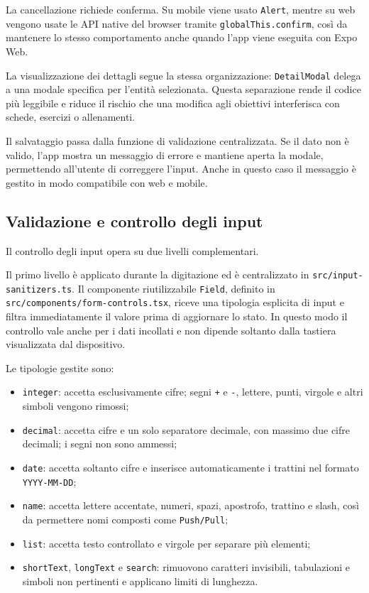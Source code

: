 \documentclass[11pt,a4paper]{article}
\begin{document}
La cancellazione richiede conferma. Su mobile viene usato \texttt{Alert}, mentre su web vengono usate le API native del browser tramite \texttt{globalThis.confirm}, così da mantenere lo stesso comportamento anche quando l'app viene eseguita con Expo Web.

La visualizzazione dei dettagli segue la stessa organizzazione: \texttt{DetailModal} delega a una modale specifica per l'entità selezionata. Questa separazione rende il codice più leggibile e riduce il rischio che una modifica agli obiettivi interferisca con schede, esercizi o allenamenti.

Il salvataggio passa dalla funzione di validazione centralizzata. Se il dato non è valido, l'app mostra un messaggio di errore e mantiene aperta la modale, permettendo all'utente di correggere l'input. Anche in questo caso il messaggio è gestito in modo compatibile con web e mobile.

\subsection{Validazione e controllo degli input}

Il controllo degli input opera su due livelli complementari.

Il primo livello è applicato durante la digitazione ed è centralizzato in \texttt{src/input-sanitizers.ts}. Il componente riutilizzabile \texttt{Field}, definito in \texttt{src/components/form-controls.tsx}, riceve una tipologia esplicita di input e filtra immediatamente il valore prima di aggiornare lo stato. In questo modo il controllo vale anche per i dati incollati e non dipende soltanto dalla tastiera visualizzata dal dispositivo.

Le tipologie gestite sono:

\begin{itemize}
  \item \texttt{integer}: accetta esclusivamente cifre; segni \texttt{+} e \texttt{-}, lettere, punti, virgole e altri simboli vengono rimossi;
  \item \texttt{decimal}: accetta cifre e un solo separatore decimale, con massimo due cifre decimali; i segni non sono ammessi;
  \item \texttt{date}: accetta soltanto cifre e inserisce automaticamente i trattini nel formato \texttt{YYYY-MM-DD};
  \item \texttt{name}: accetta lettere accentate, numeri, spazi, apostrofo, trattino e slash, così da permettere nomi composti come \texttt{Push/Pull};
  \item \texttt{list}: accetta testo controllato e virgole per separare più elementi;
  \item \texttt{shortText}, \texttt{longText} e \texttt{search}: rimuovono caratteri invisibili, tabulazioni e simboli non pertinenti e applicano limiti di lunghezza.
\end{itemize}
\end{document}

